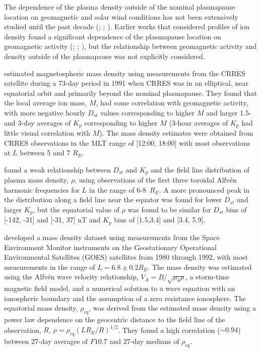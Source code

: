 \documentclass[12pt]{article}
\begin{document}
The dependence of the plasma density outside of the nominal plasmapause location on geomagnetic and solar wind conditions has not been extensively studied until the past decade (\cite{Takahashi2006}; \cite{Takahashi2010}; \cite{Denton2016}). Earlier works that considered profiles of ion density found a significant dependence of the plasmapause location on geomagnetic activity (\cite{Chappell1970}; \cite{Maynard1977}; \cite{Carpenter1992}), but the relationship between geomagnetic activity and density outside of the plasmapause was not explicitly considered.

\cite{Takahashi2006} estimated magnetospheric mass density using measurements from the CRRES satellite during a 73-day period in 1991 when CRRES was in an elliptical, near equatorial orbit and primarily beyond the nominal plasmapause. They found that the local average ion mass, $M$, had some correlation with geomagnetic activity, with more negative hourly $D_{st}$ values corresponding to higher $M$ and larger 1.5- and 3-day averages of $K_p$ corresponding to higher $M$ (3-hour averages of $K_p$ had little visual correlation with $M$). The mass density estimates were obtained from CRRES observations in the MLT range of [12:00, 18:00] with most observations at $L$ between 5 and 7 $R_E$.

\cite{Denton2006} found a weak relationship between $D_{st}$ and $K_p$ and the field line distribution of plasma mass density, $\rho$, using observations of the first three toroidal Alfv\'en harmonic frequencies for $L$ in the range of 6-8~$R_E$.  A more pronounced peak in the distribution along a field line near the equator was found for lower $D_{st}$ and larger $K_p$, but the equatorial value of $\rho$ was found to be similar for $D_{st}$ bins of [-142, -31] and [-31, 37] nT and $K_p$ bins of [1.5,3.4] and [3.4, 5.9].

\cite{Takahashi2010} developed a mass density dataset using measurements from the Space Environment Monitor instruments on the Geostationary Operational Environmental Satellites (GOES) satellites from 1980 through 1992, with most measurements in the range of $L=6.8\pm0.2 R_E$. The mass density was estimated using the Alfv\'en wave velocity relationship, $V_A=B/\sqrt{\mu_0\rho}$, a storm-time magnetic field model, and a numerical solution to a wave equation with an ionospheric boundary and the assumption of a zero resistance ionosphere.  The equatorial mass density, $\rho_{eq}$, was derived from the estimated mass density using a power law dependence on the geocentric distance to the field line of the observation, $R$, $\rho=\rho_{eq}(LR_E/R)^{1/2}$.  They found a high correlation ($\sim 0.94$) between 27-day averages of $F10.7$ and 27-day medians of $\rho_{eq}$.
\end{document}
